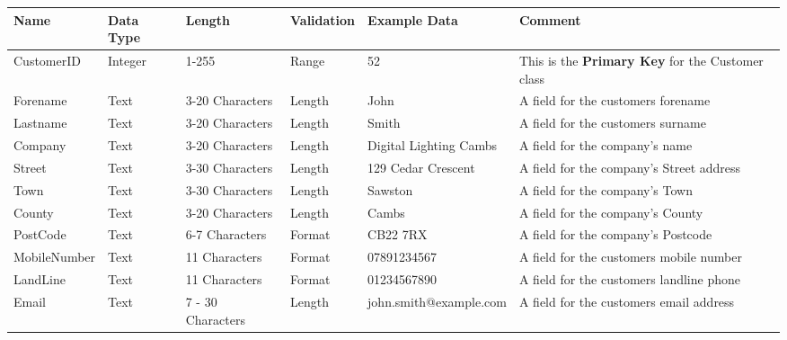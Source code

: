 \begin{landscape}
    \begin{center}
        \begin{tabular}{|p{2.3cm}|p{2cm}|p{3cm}|p{2cm}|p{4.6cm}|p{4cm}|}
            \hline
            \textbf{Name} & \textbf{Data Type} & \textbf{Length} & \textbf{Validation} & \textbf{Example Data} & \textbf{Comment} \\ \hline
            CustomerID & Integer & 1-255 & Range & 52 & This is the \textbf{Primary Key} for the Customer class \\ \hline
            Forename & Text & 3-20 Characters & Length & John & A field for the customers forename \\ \hline
            Lastname & Text & 3-20 Characters & Length & Smith & A field for the customers surname\\ \hline
            Company & Text & 3-20 Characters & Length & Digital Lighting Cambs & A field for the company's name\\ \hline
            Street & Text & 3-30 Characters & Length & 129 Cedar Crescent & A field for the company's Street address\\ \hline
            Town & Text & 3-30 Characters & Length & Sawston & A field for the company's Town \\ \hline
            County & Text & 3-20 Characters & Length & Cambs & A field for the company's County \\ \hline
            PostCode & Text & 6-7 Characters & Format & CB22 7RX & A field for the company's Postcode \\ \hline
            MobileNumber & Text & 11 Characters & Format & 07891234567 & A field for the customers mobile number\\ \hline
            LandLine & Text & 11 Characters & Format & 01234567890 & A field for the customers landline phone \\ \hline
            Email & Text & 7 - 30 Characters & Length & john.smith@example.com & A field for the customers email address\\ \hline
        \end{tabular}
    \end{center}
\end{landscape}


